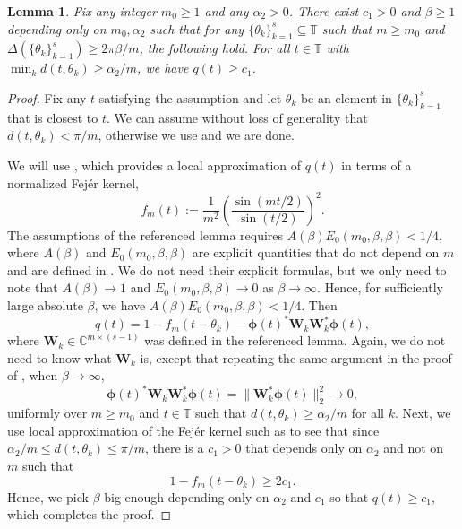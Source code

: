 \documentclass[11pt]{article}
\newtheorem{lemma}[theorem]{Lemma}
\theoremstyle{definition}
\numberwithin{theorem}{section}
\numberwithin{equation}{section}
\def\C{\mathbb{C}}
\def\T{\mathbb{T}}
\renewcommand{\subset}{\subseteq}
\newcommand{\bfW}{{\boldsymbol W}}
\newcommand{\bfphi}{{\boldsymbol \phi}}
\numberwithin{equation}{section}
\begin{document}
\begin{lemma}
    \label{lem:far1}
    Fix any integer $m_0\geq 1$ and any $\alpha_2>0$. There exist $c_1>0$ and $\beta\geq 1$ depending only on $m_0,\alpha_2$ such that for any $\{\theta_k\}_{k=1}^s\subset\T$ such that $m\geq m_0$ and $\Delta(\{\theta_k\}_{k=1}^s)\geq 2\pi\beta/m$, the following hold. For all $t\in \T$ with $\min_k d(t,\theta_k)\geq \alpha_2/m$, we have $q(t)\geq c_1$.
\end{lemma}

\begin{proof}
    Fix any $t$ satisfying the assumption and let $\theta_k$ be an element in $\{\theta_k\}_{k=1}^s$ that is closest to $t$. We can assume without loss of generality that $d(t,\theta_k)<\pi/m$, otherwise we use \cite[Lemma 9.6]{fannjiang2025optimality} and we are done. 
    
    We will use \cite[Lemma 9.3]{fannjiang2025optimality}, which provides a local approximation of $q(t)$ in terms of a normalized Fej\'er kernel,
    $$
    f_m(t) := \frac 1 {m^2} \left( \frac{\sin(mt/2)}{\sin(t/2)}\right)^2.
    $$
    The assumptions of the referenced lemma requires $A(\beta) E_0(m_0,\beta,\beta) < 1/4$, where $A(\beta)$ and $E_0(m_0,\beta,\beta)$ are explicit quantities that do not depend on $m$ and are defined in \cite[Section 9]{fannjiang2025optimality}. We do not need their explicit formulas, but we only need to note that $A(\beta)\to 1$ and $E_0(m_0,\beta,\beta) \to 0$ as $\beta\to\infty$. Hence, for sufficiently large absolute $\beta$, we have $A(\beta) E_0(m_0,\beta,\beta) < 1/4$. Then
    $$
    q(t)=1-f_m(t-\theta_k)-\bfphi(t)^* \bfW_k \bfW_k^* \bfphi(t),
    $$
    where $\bfW_k\in \C^{m\times (s-1)}$ was defined in the referenced lemma. Again, we do not need to know what $\bfW_k$ is, except that repeating the same argument in the proof of \cite[Lemma 9.6]{fannjiang2025optimality}, when $\beta\to\infty$, 
    $$
    \bfphi(t)^* \bfW_k \bfW_k^* \bfphi(t)
    = \|\bfW_k^* \bfphi(t)\|_2^2
    \to 0, 
    $$
    uniformly over $m\geq m_0$ and $t\in \T$ such that $d(t,\theta_k)\geq \alpha_2/m$ for all $k$. Next, we use local approximation of the Fej\'er kernel such as \cite[Lemma 9.10]{fannjiang2025optimality} to see that since $\alpha_2/m\leq d(t,\theta_k)\leq \pi/m$, there is a $c_1>0$ that depends only on $\alpha_2$ and not on $m$ such that 
    $$
    1-f_m(t-\theta_k)\geq 2c_1. 
    $$
    Hence, we pick $\beta$ big enough depending only on $\alpha_2$ and $c_1$ so that $q(t)\geq c_1$, which completes the proof. 
\end{proof}
\end{document}
